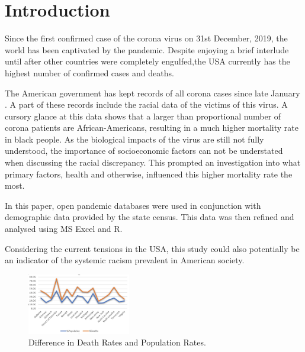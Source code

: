 \documentclass[10pt,twocolumn,letterpaper]{article}
\begin{document}
\section{Introduction}

Since the first confirmed case of the corona virus on 31st December, 2019, the world has been captivated by the pandemic. Despite enjoying a brief interlude until after other countries were completely engulfed,the USA currently has the highest number of confirmed cases and deaths.  


The American government has kept records of all corona cases since late January \cite{apm}. A part of these records include the racial data of the victims of this virus. A cursory glance at this data shows that a larger than proportional number of corona patients are African-Americans, resulting in a much higher mortality rate in black people. As the biological impacts of the virus are still not fully understood, the importance of socioeconomic factors can not be understated when discussing the racial discrepancy. This prompted an investigation into what primary factors, health and otherwise, influenced this higher mortality rate the most.

In this paper, open pandemic databases were used in conjunction with demographic data provided by the state census. This data was then refined and analysed using MS Excel and R. 

Considering the current tensions in the USA, this study could also potentially be an indicator of the systemic racism prevalent in American society. 


\begin{figure}
  \centering
  \includegraphics[width=0.4\textwidth]{figures/Deaths vs Pop.jpg}
  \caption{Difference in Death Rates and Population Rates.}
\end{figure}


\end{document}
